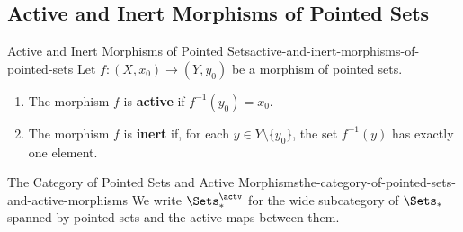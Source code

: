 \subsection{Active and Inert Morphisms of Pointed Sets}\label{subsection-active-and-inert-morphisms-of-pointed-sets}
\begin{definition}{Active and Inert Morphisms of Pointed Sets}{active-and-inert-morphisms-of-pointed-sets}%
    Let $f\colon(X,x_{0})\to(Y,y_{0})$ be a morphism of pointed sets.
    \begin{enumerate}
        \item\label{active-and-inert-morphisms-of-pointed-sets-active-morphisms-of-pointed-sets}The morphism $f$ is \textbf{active} if $f^{-1}(y_{0})=x_{0}$.
        \item\label{active-and-inert-morphisms-of-pointed-sets-inert-morphisms-of-pointed-sets}The morphism $f$ is \textbf{inert} if, for each $y\in Y \setminus \{y_0\}$, the set $f^{-1}(y)$ has exactly one element.
    \end{enumerate}
\end{definition}
\begin{notation}{The Category of Pointed Sets and Active Morphisms}{the-category-of-pointed-sets-and-active-morphisms}%
    We write $\Sets^{\actv}_{*}$ for the wide subcategory of $\Sets_{*}$ spanned by pointed sets and the active maps between them.
\end{notation}
